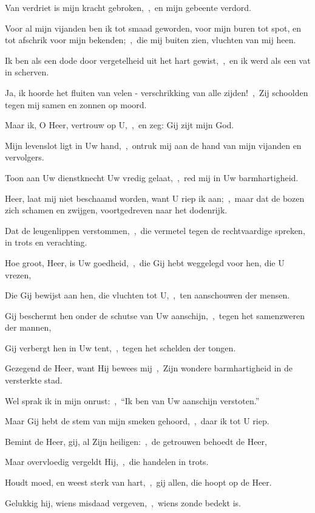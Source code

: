 \documentclass[12pt,twoside,a5paper]{article}
\begin{document}
\begin{halfparskip}
  Van verdriet is mijn kracht gebroken,~\sep\ en mijn gebeente verdord.

  Voor al mijn vijanden ben ik tot smaad geworden, voor mijn buren tot spot, en tot afschrik voor mijn bekenden;~\sep\ die mij buiten zien, vluchten van mij heen.

  Ik ben als een dode door vergetelheid uit het hart gewist,~\sep\ en ik werd als een vat in scherven.

  Ja, ik hoorde het fluiten van velen - verschrikking van alle zijden!~\sep\ Zij schoolden tegen mij samen en zonnen op moord.

  Maar ik, O Heer, vertrouw op U,~\sep\ en zeg: Gij zijt mijn God.

  Mijn levenslot ligt in Uw hand,~\sep\ ontruk mij aan de hand van mijn vijanden en vervolgers.

  Toon aan Uw dienstknecht Uw vredig gelaat,~\sep\ red mij in Uw barmhartigheid.

  Heer, laat mij niet beschaamd worden, want U riep ik aan;~\sep\ maar dat de bozen zich schamen en zwijgen, voortgedreven naar het dodenrijk.

  Dat de leugenlippen verstommen,~\sep\ die vermetel tegen de rechtvaardige spreken, in trots en verachting.

  Hoe groot, Heer, is Uw goedheid,~\sep\ die Gij hebt weggelegd voor hen, die U vrezen,

  Die Gij bewijst aan hen, die vluchten tot U,~\sep\ ten aanschouwen der mensen.

  Gij beschermt hen onder de schutse van Uw aanschijn,~\sep\ tegen het samenzweren der mannen,

  Gij verbergt hen in Uw tent,~\sep\ tegen het schelden der tongen.

  Gezegend de Heer, want Hij bewees mij~\sep\ Zijn wondere barmhartigheid in de versterkte stad.

  Wel sprak ik in mijn onrust:~\sep\ ``Ik ben van Uw aanschijn verstoten.''

  Maar Gij hebt de stem van mijn smeken gehoord,~\sep\ daar ik tot U riep.

  Bemint de Heer, gij, al Zijn heiligen:~\sep\ de getrouwen behoedt de Heer,

  Maar overvloedig vergeldt Hij,~\sep\ die handelen in trots.

  Houdt moed, en weest sterk van hart,~\sep\ gij allen, die hoopt op de Heer.

   Gelukkig hij, wiens misdaad vergeven,~\sep\ wiens zonde bedekt is.


\end{halfparskip}
\end{document}
